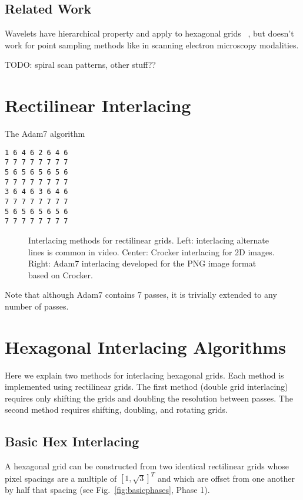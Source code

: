 \documentclass{article}
\begin{document}
\subsection{Related Work}
\label{sec:wavelets}

Wavelets have hierarchical property and apply to hexagonal grids~ \cite{jeevan2014compression}
, but doesn't work for point sampling methods
like in scanning electron microscopy modalities.

TODO: spiral scan patterns, other stuff??


\section{Rectilinear Interlacing}
\label{sec:rect}

The Adam7 algorithm

\begin{verbatim}
1 6 4 6 2 6 4 6
7 7 7 7 7 7 7 7
5 6 5 6 5 6 5 6
7 7 7 7 7 7 7 7
3 6 4 6 3 6 4 6
7 7 7 7 7 7 7 7
5 6 5 6 5 6 5 6
7 7 7 7 7 7 7 7
\end{verbatim}

\begin{figure}[ht]
\caption{\label{fig:squareinterlacing} Interlacing methods for rectilinear grids. Left: interlacing alternate lines is common in video. Center: Crocker interlacing for 2D images. Right: Adam7 interlacing developed for the PNG image format based on Crocker.}
\end{figure}

Note that although Adam7 contains 7 passes, it is trivially extended to
any number of passes.


\section{Hexagonal Interlacing Algorithms}
\label{sec:hexinter}

Here we explain two methods for interlacing hexagonal grids.
%
Each method is implemented using rectilinear grids.
%
The first method (double grid interlacing) requires only shifting the grids and doubling the resolution between passes.
%
The second method requires shifting, doubling, and rotating grids.


\subsection{Basic Hex Interlacing}
\label{double-grid-interlacing}

A hexagonal grid can be constructed from two identical rectilinear grids
whose pixel spacings are a multiple of $[1, \sqrt{3}]^T$ and which are offset from one another by half that spacing (see Fig.~\ref{fig:basicphases}, Phase 1).
\end{document}
